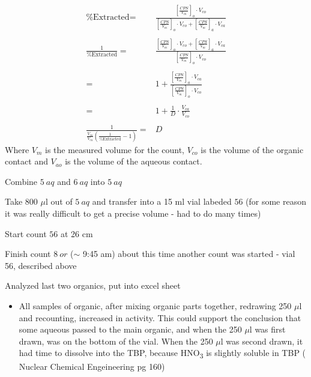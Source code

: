 \documentclass[idxtotoc,hyperref,openany,oneside]{labbook} %
\newcommand{\cmark}{\ding{51}}%
\newcommand{\done}{\rlap{$\square$}{\raisebox{2pt}{\large\hspace{1pt}\cmark}}%
  \hspace{-2.5pt}}
\newcommand{\tsbs}{\textsubscript}
\begin{document}
\begin{align*}
  \text{\% Extracted}=&\frac{[\frac{CPS}{V_{m}}]_o\cdot V_{co}}
       {[\frac{CPS}{V_{m}}]_o\cdot V_{co}+
         [\frac{CPS}{V_{m}}]_a\cdot V_{ca}}\\~\\
       \frac{1}{\text{\% Extracted}}
       =&\frac{[\frac{CPS}{V_{m}}]_o\cdot V_{co}+
         [\frac{CPS}{V_{m}}]_a\cdot V_{ca}}
       {[\frac{CPS}{V_{m}}]_o\cdot V_{co}}\\~\\
       =&1+\frac{[\frac{CPS}{V_m}]_a\cdot V_{ca}}
       {[\frac{CPS}{V_m}]_o\cdot V_{co}}\\~\\
       =&1+\frac{1}{D}\cdot\frac{V_{ca}}{V_{co}}\\~\\
       \frac{1}{\frac{V_{co}}{V_{ca}}\left(\frac{1}{\text{\% Extracted}}-1
       \right)}
       =&D
\end{align*}
Where $V_m$ is the measured volume for the count, $V_{co}$ is
the volume of the organic contact and $V_{ao}$ is the volume
of the aqueous contact. 

\begin{todolist}
\item[\done]{Combine $\boxed{5\ aq}$ and $\boxed{6\ aq}$
  into $\boxed{5\ aq}$}
\item[\done]{Take 800 $\mu$l out of $\boxed{5\ aq}$ and transfer
  into a 15 ml vial labeded $\boxed{56}$ (for some reason
  it was really difficult to get a precise volume - had to do
  many times)}
\item[\done]{Start count $\boxed{56}$ at 26 cm}
\end{todolist}


\begin{todolist}
\item[\done]{Finish count $\boxed{8\ or}$ ($\sim$ 9:45 am)
  about this time another count was started - vial 56,
  described above}
\item[\done]{Analyzed last two organics, put into excel
  sheet}
  \begin{itemize}
  \item{All samples of organic, after mixing organic parts together,
    redrawing 250 $\mu$l and recounting, increased in activity.
    This could support the conclusion that some aqueous passed
    to the main organic, and when the 250 $\mu$l was first drawn,
    was on the bottom of the vial. When the 250 $\mu$l was second
    drawn, it had time to dissolve into the TBP, because
    HNO\tsbs{3} is slightly soluble in TBP (
    Nuclear Chemical Engeineering pg 160)}
  \end{itemize}
\end{todolist}
\end{document}

